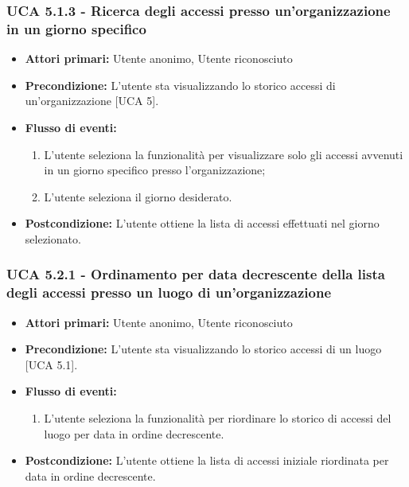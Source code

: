 \subsubsection{UCA 5.1.3 - Ricerca degli accessi presso un'organizzazione in un giorno specifico}
\begin{itemize}
    \item \textbf{Attori primari:} Utente anonimo, Utente riconosciuto
    \item \textbf{Precondizione:} L'utente sta visualizzando lo storico accessi di un'organizzazione [UCA 5].
    \item \textbf{Flusso di eventi:}
    \begin{enumerate}
        \item L'utente seleziona la funzionalità per visualizzare solo gli accessi avvenuti in un giorno specifico presso l'organizzazione;
        \item L'utente seleziona il giorno desiderato.
    \end{enumerate}
    \item \textbf{Postcondizione:} L'utente ottiene la lista di accessi effettuati nel giorno selezionato.
\end{itemize}

\subsubsection{UCA 5.2.1 - Ordinamento per data decrescente della lista degli accessi presso un luogo di un'organizzazione}
\begin{itemize}
    \item \textbf{Attori primari:} Utente anonimo, Utente riconosciuto
    \item \textbf{Precondizione:} L'utente sta visualizzando lo storico accessi di un luogo [UCA 5.1].
    \item \textbf{Flusso di eventi:}
    \begin{enumerate}
        \item L'utente seleziona la funzionalità per riordinare lo storico di accessi del luogo per data in ordine decrescente.
    \end{enumerate}
    \item \textbf{Postcondizione:} L'utente ottiene la lista di accessi iniziale riordinata per data in ordine decrescente.
\end{itemize}

